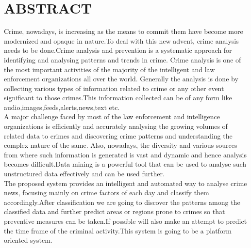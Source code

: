 \chapter*{\Huge\textbf{ABSTRACT}}

\hspace*{5em}Crime, nowadays, is increasing as the means to commit them have become more  modernized and opaque in nature.To deal with this new advent, crime analysis needs to be done.Crime 
analysis and prevention is a systematic approach for identifying and analysing patterns and trends in crime. Crime analysis is one of the most important activities  of the majority of 
the intelligent and law enforcement organizations all over the world. Generally the analysis is done by collecting various types of information related to crime or any other event 
significant to those crimes.This information collected can be of any form like audio,images,feeds,alerts,news,text etc.\\

A  major challenge faced by most of the law enforcement and 
intelligence organizations  is efficiently and accurately analysing the growing volumes of related data to crimes and discovering crime patterns and understanding the complex nature 
of the same. Also, nowadays, the diversity and various sources from where such information is generated is vast and dynamic and hence analysis becomes difficult.Data mining is a powerful tool that can be used to analyse such unstructured data effectively and can be used further.\\

The proposed system provides an intelligent and automated way to 
analyse crime news, focusing mainly on crime factors of each day and classify them accordingly.After classification we are going to discover the patterns among the classified data 
and further predict areas or regions prone to crimes so that preventive measures can be taken.If possible will also make an attempt to predict the time frame of the criminal 
activity.This system is going to be a platform oriented  system.


